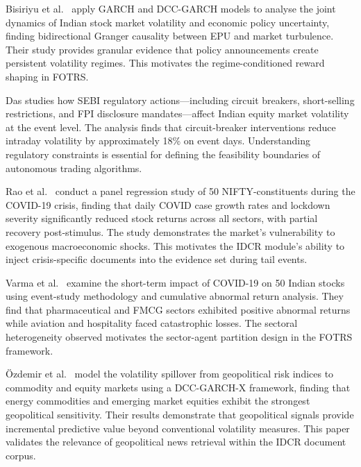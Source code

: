 \documentclass[12pt,a4paper,oneside]{report}
\theoremstyle{definition}
\theoremstyle{remark}
\begin{document}
\medskip

\noindent Bisiriyu et al.\ \cite{Bisiriyu2025EPUIndia} apply GARCH and DCC-GARCH models to analyse the joint dynamics of Indian stock market volatility and economic policy uncertainty, finding bidirectional Granger causality between EPU and market turbulence. Their study provides granular evidence that policy announcements create persistent volatility regimes. This motivates the regime-conditioned reward shaping in FOTRS.

\medskip

\noindent Das \cite{Das2017SEBI} studies how SEBI regulatory actions---including circuit breakers, short-selling restrictions, and FPI disclosure mandates---affect Indian equity market volatility at the event level. The analysis finds that circuit-breaker interventions reduce intraday volatility by approximately 18\% on event days. Understanding regulatory constraints is essential for defining the feasibility boundaries of autonomous trading algorithms.

\medskip

\noindent Rao et al.\ \cite{Rao2021COVID19Contagion} conduct a panel regression study of 50 NIFTY-constituents during the COVID-19 crisis, finding that daily COVID case growth rates and lockdown severity significantly reduced stock returns across all sectors, with partial recovery post-stimulus. The study demonstrates the market's vulnerability to exogenous macroeconomic shocks. This motivates the IDCR module's ability to inject crisis-specific documents into the evidence set during tail events.

\medskip

\noindent Varma et al.\ \cite{Varma2021COVID19Impact} examine the short-term impact of COVID-19 on 50 Indian stocks using event-study methodology and cumulative abnormal return analysis. They find that pharmaceutical and FMCG sectors exhibited positive abnormal returns while aviation and hospitality faced catastrophic losses. The sectoral heterogeneity observed motivates the sector-agent partition design in the FOTRS framework.

\medskip

\noindent \"{O}zdemir et al.\ \cite{Ozdemir2025Geopolitical} model the volatility spillover from geopolitical risk indices to commodity and equity markets using a DCC-GARCH-X framework, finding that energy commodities and emerging market equities exhibit the strongest geopolitical sensitivity. Their results demonstrate that geopolitical signals provide incremental predictive value beyond conventional volatility measures. This paper validates the relevance of geopolitical news retrieval within the IDCR document corpus.
\end{document}
